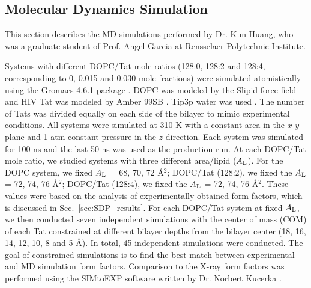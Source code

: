 \subsection{Molecular Dynamics Simulation}\label{sim_methods}
This section describes the MD simulations performed by Dr. Kun Huang, who was
a graduate student of Prof. Angel Garcia at Rensselaer Polytechnic Institute.

Systems with different DOPC/Tat mole ratios (128:0, 128:2 and 128:4, corresponding to
0, 0.015 and 0.030 mole fractions) were simulated atomistically using the Gromacs 4.6.1
package \cite{Hess08}. 
DOPC was modeled by the Slipid force field 
\cite{Jambeck12_JPCB,Jambeck12_JCTC} 
and HIV Tat was modeled by Amber 99SB \cite{Hornak06}. 
Tip3p water was used \cite{Jorgensen83}. The number of Tats was divided equally on
each side of the bilayer to mimic experimental conditions. All systems were simulated at 310 K
with a constant area in the $x$-$y$ plane and 1 atm constant pressure in the $z$ direction. Each
system was simulated for 100 ns and the last 50 ns was used as the production run.
At each DOPC/Tat mole ratio, we studied systems with three different area/lipid ($A_\textrm{L}$).
For the DOPC system, we fixed $A_\textrm{L}$ = 68, 70, 72 \AA$^2$; 
DOPC/Tat (128:2), we fixed the $A_\textrm{L}$ = 72, 74, 76 \AA$^2$; 
DOPC/Tat (128:4), we fixed the $A_\textrm{L}$ = 72, 74, 76 \AA$^2$. 
These values were based on the analysis of experimentally obtained form 
factors, which is discussed in Sec.~\ref{sec:SDP_results}.
For each DOPC/Tat system at fixed $A_\textrm{L}$, 
we then conducted seven independent simulations with the center of mass (COM) of
each Tat constrained at different bilayer depths from the bilayer center 
(18, 16, 14, 12, 10, 8 and 5 \AA). 
In total, 45 independent simulations were conducted. 
The goal of constrained simulations is to find the best match between 
experimental and MD simulation form factors. Comparison to
the X-ray form factors was performed using the SIMtoEXP software 
written by Dr. Norbert Kucerka \cite{Kucerka10}. 

